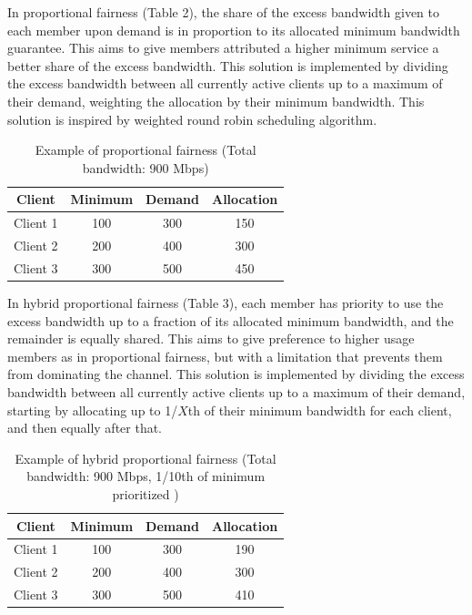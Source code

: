 \documentclass[accepted,single]{gipaper}
\begin{document}
In proportional fairness (Table 2), the share of the excess bandwidth given to each member upon demand is in proportion to its allocated minimum bandwidth guarantee. This aims to give members attributed a higher minimum service a better share of the excess bandwidth. This solution is implemented by dividing the excess bandwidth between all currently active clients up to a maximum of their demand, weighting the allocation by their minimum bandwidth. This solution is inspired by weighted round robin scheduling algorithm.

\begin{table}[htpb]
	\label{proportional_table}
	\vspace{-3mm}
	\begin{center}
		\begin{small}
			\begin{tabular}{cccc}
				Client & Minimum & Demand & Allocation \\
				\hline
				Client 1 & 100 & 300 & 150 \\
				Client 2 & 200 & 400 & 300 \\
				Client 3 & 300 & 500 & 450 \\
			\end{tabular}
		\end{small}
	\end{center}
	\caption{Example of proportional fairness (Total bandwidth: 900 Mbps)}
	\vspace{-3mm}
\end{table}

In hybrid proportional fairness (Table 3), each member has priority to use the excess bandwidth up to a fraction of its allocated minimum bandwidth, and the remainder is equally shared. This aims to give preference to higher usage members as in proportional fairness, but with a limitation that prevents them from dominating the channel. This solution is implemented by dividing the excess bandwidth between all currently active clients up to a maximum of their demand, starting by allocating up to 1/$X$th of their minimum bandwidth for each client, and then equally after that.

\begin{table}[h]
	\label{hybrid_table}
	\vspace{-3mm}
	\begin{center}
		\begin{small}
			\begin{tabular}{cccc}
				Client & Minimum & Demand & Allocation \\
				\hline
				Client 1 & 100 & 300 & 190 \\
				Client 2 & 200 & 400 & 300 \\
				Client 3 & 300 & 500 & 410 \\
			\end{tabular}
		\end{small}
	\end{center}
	\caption{Example of hybrid proportional fairness (Total bandwidth: 900 Mbps, 1/10th of minimum prioritized )}
	\vspace{-3mm}
\end{table}
\end{document}
